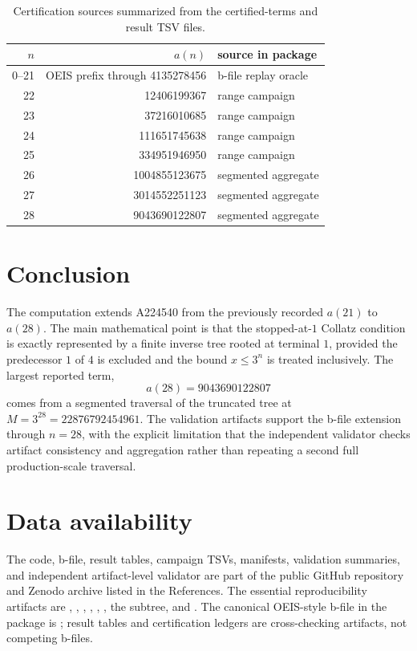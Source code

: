 \documentclass[11pt]{article}
\theoremstyle{definition}
\theoremstyle{remark}
\begin{document}
\begin{table}[ht]
\centering
\begin{tabular}{rrl}
\toprule
\(n\) & \(a(n)\) & source in package \\
\midrule
0--21 & OEIS prefix through 4135278456 & b-file replay oracle \\
22 & 12406199367 & range campaign \\
23 & 37216010685 & range campaign \\
24 & 111651745638 & range campaign \\
25 & 334951946950 & range campaign \\
26 & 1004855123675 & segmented aggregate \\
27 & 3014552251123 & segmented aggregate \\
28 & 9043690122807 & segmented aggregate \\
\bottomrule
\end{tabular}
\caption{Certification sources summarized from the certified-terms and result
TSV files.}
\label{tab:terms}
\end{table}

\section{Conclusion}

The computation extends A224540 from the previously recorded \(a(21)\) to
\(a(28)\).  The main mathematical point is that the stopped-at-\(1\) Collatz
condition is exactly represented by a finite inverse tree rooted at terminal
\(1\), provided the predecessor \(1\) of \(4\) is excluded and the bound
\(x\leq 3^n\) is treated inclusively.  The largest reported term,
\[
a(28)=9043690122807
\]
comes from a segmented traversal of the truncated tree at
\(M=3^{28}=22876792454961\).  The validation artifacts support the b-file
extension through \(n=28\), with the explicit limitation that the independent
validator checks artifact consistency and aggregation rather than repeating a
second full production-scale traversal.

\section*{Data availability}

The code, b-file, result tables, campaign TSVs, manifests, validation
summaries, and independent artifact-level validator are part of the public
GitHub repository and Zenodo archive listed in the References.
The essential reproducibility artifacts are ,
, ,
, ,
, the 
subtree, and .  The canonical
OEIS-style b-file in the package is ; result tables and
certification ledgers are cross-checking artifacts, not competing b-files.
\end{document}
